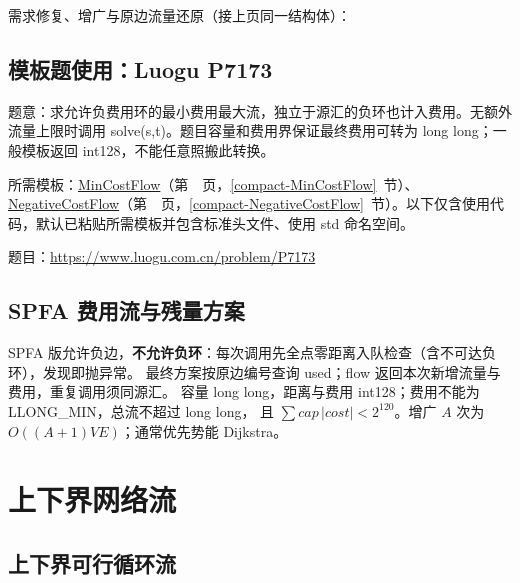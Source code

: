 \Needspace{492pt}



\newpage

\noindent 需求修复、增广与原边流量还原（接上页同一结构体）：



\Needspace{362pt}

\subsection*{模板题使用：Luogu P7173}

\label{usage-example-98}

题意：求允许负费用环的最小费用最大流，独立于源汇的负环也计入费用。无额外流量上限时调用 solve(s,t)。题目容量和费用界保证最终费用可转为 long long；一般模板返回 int128，不能任意照搬此转换。

所需模板：\hyperref[compact-MinCostFlow]{MinCostFlow}（第~\pageref{compact-MinCostFlow}~页，\ref{compact-MinCostFlow}~节）、\hyperref[compact-NegativeCostFlow]{NegativeCostFlow}（第~\pageref{compact-NegativeCostFlow}~页，\ref{compact-NegativeCostFlow}~节）。以下仅含使用代码，默认已粘贴所需模板并包含标准头文件、使用 std 命名空间。

题目：\url{https://www.luogu.com.cn/problem/P7173}



\subsection{SPFA 费用流与残量方案}\label{knowledge-spfa-cost}
SPFA 版允许负边，\textbf{不允许负环}：每次调用先全点零距离入队检查（含不可达负环），发现即抛异常。
最终方案按原边编号查询 used；flow 返回本次新增流量与费用，重复调用须同源汇。
容量 long long，距离与费用 int128；费用不能为 LLONG\_MIN，总流不超过 long long，
且 $\sum cap\,|cost|<2^{120}$。增广 $A$ 次为 $O((A+1)VE)$；通常优先势能 Dijkstra。



\Needspace{680pt}

\section{上下界网络流}

\subsection{上下界可行循环流}\label{compact-BoundedCirculation}

